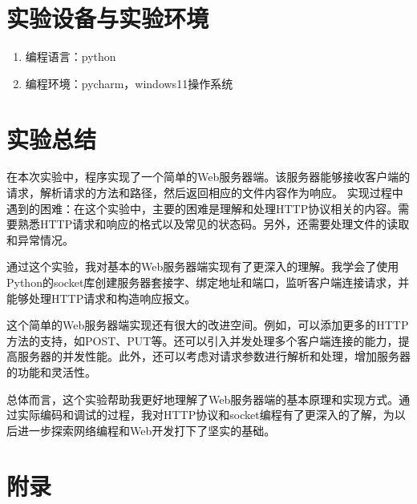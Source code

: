 \documentclass[UTF8,12pt]{article}
\begin{document}
\section{实验设备与实验环境}
\begin{enumerate}
    \item 编程语言：python
    \item 编程环境：pycharm，windows11操作系统
\end{enumerate}
\section{实验总结}
在本次实验中，程序实现了一个简单的Web服务器端。该服务器能够接收客户端的请求，解析请求的方法和路径，然后返回相应的文件内容作为响应。
实现过程中遇到的困难：在这个实验中，主要的困难是理解和处理HTTP协议相关的内容。需要熟悉HTTP请求和响应的格式以及常见的状态码。另外，还需要处理文件的读取和异常情况。

通过这个实验，我对基本的Web服务器端实现有了更深入的理解。我学会了使用Python的socket库创建服务器套接字、绑定地址和端口，监听客户端连接请求，并能够处理HTTP请求和构造响应报文。

这个简单的Web服务器端实现还有很大的改进空间。例如，可以添加更多的HTTP方法的支持，如POST、PUT等。还可以引入并发处理多个客户端连接的能力，提高服务器的并发性能。此外，还可以考虑对请求参数进行解析和处理，增加服务器的功能和灵活性。

总体而言，这个实验帮助我更好地理解了Web服务器端的基本原理和实现方式。通过实际编码和调试的过程，我对HTTP协议和socket编程有了更深入的了解，为以后进一步探索网络编程和Web开发打下了坚实的基础。

\section{附录}
\end{document}
